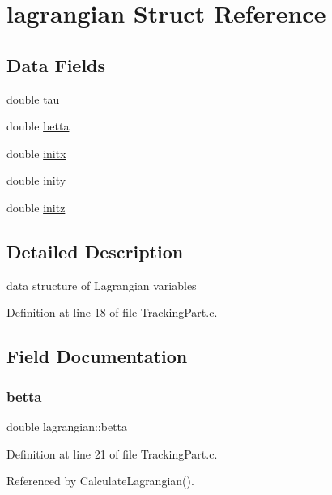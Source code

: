 \hypertarget{structlagrangian}{}\section{lagrangian Struct Reference}
\label{structlagrangian}
\subsection*{Data Fields}
\begin{DoxyCompactItemize}
\item 
double \mbox{\hyperlink{structlagrangian_a6c0717ffd474442f1651a1f7ebec625f}{tau}}
\item 
double \mbox{\hyperlink{structlagrangian_ad5fabc5bfeccc6ba7e60fbdf966c21d7}{betta}}
\item 
double \mbox{\hyperlink{structlagrangian_aa3a20ad03006649a17790bd31560af8f}{initx}}
\item 
double \mbox{\hyperlink{structlagrangian_a75fb1c376f05bb7ba3eaee13cab24067}{inity}}
\item 
double \mbox{\hyperlink{structlagrangian_a44e890e0ddb81f46f4aa3c1e7c029a73}{initz}}
\end{DoxyCompactItemize}


\subsection{Detailed Description}
data structure of Lagrangian variables 

Definition at line 18 of file Tracking\+Part.\+c.



\subsection{Field Documentation}
\mbox{\label{structlagrangian_ad5fabc5bfeccc6ba7e60fbdf966c21d7}} 
\subsubsection{\texorpdfstring{betta}{betta}}
{\footnotesize\ttfamily double lagrangian\+::betta}



Definition at line 21 of file Tracking\+Part.\+c.



Referenced by Calculate\+Lagrangian().

